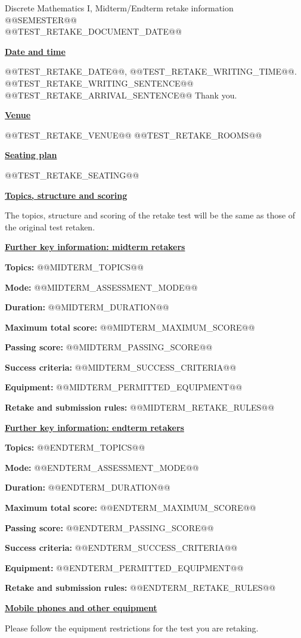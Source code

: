 \documentclass[11pt,a4paper]{article}
\newcommand{\heading}[1]{\par\medskip\textbf{\underline{#1}}\par}
\begin{document}
\begin{center}\large
Discrete Mathematics I, Midterm/Endterm retake information\\
@@SEMESTER@@\\
@@TEST_RETAKE_DOCUMENT_DATE@@
\end{center}

\heading{Date and time}
@@TEST_RETAKE_DATE@@, @@TEST_RETAKE_WRITING_TIME@@.
@@TEST_RETAKE_WRITING_SENTENCE@@
@@TEST_RETAKE_ARRIVAL_SENTENCE@@
Thank you.

\heading{Venue}
@@TEST_RETAKE_VENUE@@
@@TEST_RETAKE_ROOMS@@

\heading{Seating plan}
@@TEST_RETAKE_SEATING@@

\heading{Topics, structure and scoring}
The topics, structure and scoring of the retake test will be the same as those of
the original test retaken.

\heading{Further key information: midterm retakers}
\textbf{Topics:} @@MIDTERM_TOPICS@@\par
\textbf{Mode:} @@MIDTERM_ASSESSMENT_MODE@@\par
\textbf{Duration:} @@MIDTERM_DURATION@@\par
\textbf{Maximum total score:} @@MIDTERM_MAXIMUM_SCORE@@\par
\textbf{Passing score:} @@MIDTERM_PASSING_SCORE@@\par
\textbf{Success criteria:} @@MIDTERM_SUCCESS_CRITERIA@@\par
\textbf{Equipment:} @@MIDTERM_PERMITTED_EQUIPMENT@@\par
\textbf{Retake and submission rules:} @@MIDTERM_RETAKE_RULES@@

\heading{Further key information: endterm retakers}
\textbf{Topics:} @@ENDTERM_TOPICS@@\par
\textbf{Mode:} @@ENDTERM_ASSESSMENT_MODE@@\par
\textbf{Duration:} @@ENDTERM_DURATION@@\par
\textbf{Maximum total score:} @@ENDTERM_MAXIMUM_SCORE@@\par
\textbf{Passing score:} @@ENDTERM_PASSING_SCORE@@\par
\textbf{Success criteria:} @@ENDTERM_SUCCESS_CRITERIA@@\par
\textbf{Equipment:} @@ENDTERM_PERMITTED_EQUIPMENT@@\par
\textbf{Retake and submission rules:} @@ENDTERM_RETAKE_RULES@@

\heading{Mobile phones and other equipment}
Please follow the equipment restrictions for the test you are retaking.
\end{document}
